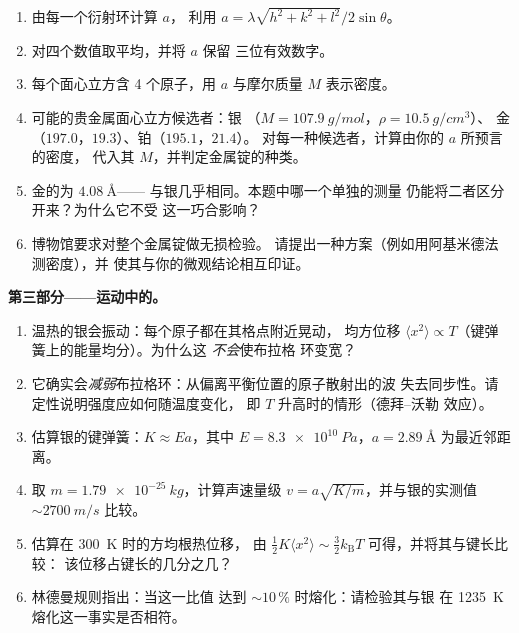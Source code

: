 \begin{problem}
\begin{enumerate}[resume]
  \item 由每一个衍射环计算 $a$，
        利用 $a = \lambda\sqrt{h^2+k^2+l^2}/2\sin\theta$。
  \item 对四个数值取平均，并将 $a$ 保留
        三位有效数字。
  \item 每个面心立方含 4 个原子，用
        $a$ 与摩尔质量 $M$ 表示密度。
  \item 可能的贵金属面心立方候选者：银
        （$M = \qty{107.9}{g/mol}$，$\rho = \qty{10.5}{g/cm^3}$）、
        金（$197.0$，$19.3$）、铂（$195.1$，$21.4$）。
        对每一种候选者，计算由你的 $a$ 所预言的密度，
        代入其 $M$，并判定金属锭的种类。
  \item 金的为 $\qty{4.08}{\angstrom}$——
        与银几乎相同。本题中哪一个单独的测量
        仍能将二者区分开来？为什么它不受
        这一巧合影响？
  \item 博物馆要求对整个金属锭做无损检验。
        请提出一种方案（例如用阿基米德法测密度），并
        使其与你的微观结论相互印证。
\end{enumerate}

\medskip\noindent\textbf{第三部分——运动中的。}

\begin{enumerate}[resume]
  \item 温热的银会振动：每个原子都在其格点附近晃动，
        均方位移 $\langle x^2\rangle \propto T$（键弹簧上的能量均分）。为什么这
        \emph{不会}使布拉格
        环变宽？
  \item 它确实会\emph{减弱}布拉格环：从偏离平衡位置的原子散射出的波
        失去同步性。请定性说明强度应如何随温度变化，
        即 $T$ 升高时的情形（德拜–沃勒
        效应）。
  \item 估算银的键弹簧：$K \approx Ea$，其中
        $E = \qty{8.3e10}{Pa}$，$a = \qty{2.89}{\angstrom}$
        为最近邻距离。
  \item 取 $m = \qty{1.79e-25}{kg}$，计算声速量级
        $v = a\sqrt{K/m}$，并与银的实测值
        $\sim\qty{2700}{m/s}$ 比较。
  \item 估算在 \qty{300}{K} 时的方均根热位移，
        由 $\tfrac12K\langle x^2\rangle \sim
        \tfrac32k_{\text{B}}T$ 可得，并将其与键长比较：
        该位移占键长的几分之几？
  \item 林德曼规则指出：当这一比值
        达到 $\sim10\,\%$ 时熔化：请检验其与银
        在 \qty{1235}{K} 熔化这一事实是否相符。
\end{enumerate}


\end{problem}
